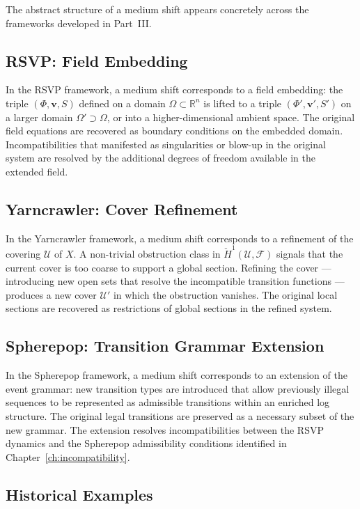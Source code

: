\documentclass[11pt,openany]{book}
\begin{document}
The abstract structure of a medium shift appears concretely
across the frameworks developed in Part~III.

\subsection{RSVP: Field Embedding}

In the RSVP framework, a medium shift corresponds to a
field embedding: the triple $(\Phi, \boldsymbol{v}, S)$
defined on a domain $\Omega \subset \mathbb{R}^n$ is lifted
to a triple $(\Phi', \boldsymbol{v}', S')$ on a larger
domain $\Omega' \supset \Omega$, or into a higher-dimensional
ambient space.  The original field equations are recovered
as boundary conditions on the embedded domain.
Incompatibilities that manifested as singularities or
blow-up in the original system are resolved by the
additional degrees of freedom available in the extended
field.

\subsection{Yarncrawler: Cover Refinement}

In the Yarncrawler framework, a medium shift corresponds
to a refinement of the covering $\mathcal{U}$ of $X$.  A
non-trivial obstruction class in $\check{H}^1(\mathcal{U},
\mathcal{F})$ signals that the current cover is too coarse
to support a global section.  Refining the cover ---
introducing new open sets that resolve the incompatible
transition functions --- produces a new cover $\mathcal{U}'$
in which the obstruction vanishes.  The original local
sections are recovered as restrictions of global sections
in the refined system.

\subsection{Spherepop: Transition Grammar Extension}

In the Spherepop framework, a medium shift corresponds to
an extension of the event grammar: new transition types
are introduced that allow previously illegal sequences to
be represented as admissible transitions within an
enriched log structure.  The original legal transitions
are preserved as a necessary subset of the new grammar.
The extension resolves incompatibilities between the RSVP
dynamics and the Spherepop admissibility conditions
identified in Chapter~\ref{ch:incompatibility}.

\subsection{Historical Examples}
\end{document}
